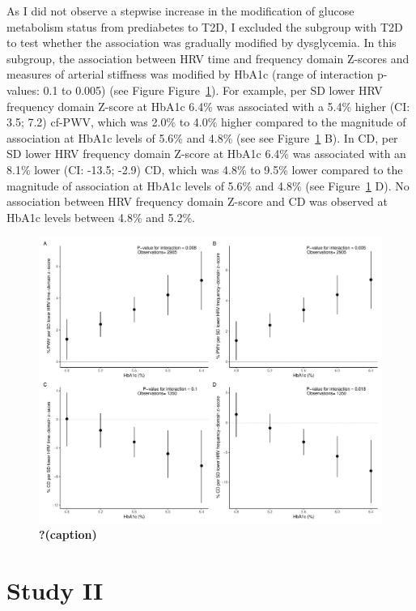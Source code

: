 \documentclass[
  a4paper,
  headsepline=true,
  open=any]{scrbook}
\begin{document}
As I did not observe a stepwise increase in the modification of glucose
metabolism status from prediabetes to T2D, I excluded the subgroup with
T2D to test whether the association was gradually modified by
dysglycemia. In this subgroup, the association between HRV time and
frequency domain Z-scores and measures of arterial stiffness was
modified by HbA1c (range of interaction p-values: 0.1 to 0.005) (see
Figure Figure~\ref{fig-MS-HRV}). For example, per SD lower HRV frequency
domain Z-score at HbA1c 6.4\% was associated with a 5.4\% higher (CI:
3.5; 7.2) cf-PWV, which was 2.0\% to 4.0\% higher compared to the
magnitude of association at HbA1c levels of 5.6\% and 4.8\% (see see
Figure~\ref{fig-MS-HRV} B). In CD, per SD lower HRV frequency domain
Z-score at HbA1c 6.4\% was associated with an 8.1\% lower (CI: -13.5;
-2.9) CD, which was 4.8\% to 9.5\% lower compared to the magnitude of
association at HbA1c levels of 5.6\% and 4.8\% (see
Figure~\ref{fig-MS-HRV} D). No association between HRV frequency domain
Z-score and CD was observed at HbA1c levels between 4.8\% and 5.2\%.

\begin{figure}

{\centering \includegraphics{images/em_hba1c.pdf}

}

\caption{\label{fig-MS-HRV}\textbf{?(caption)}}

\end{figure}

\hypertarget{study-ii}{%
\section{Study II}\label{study-ii}}
\end{document}
